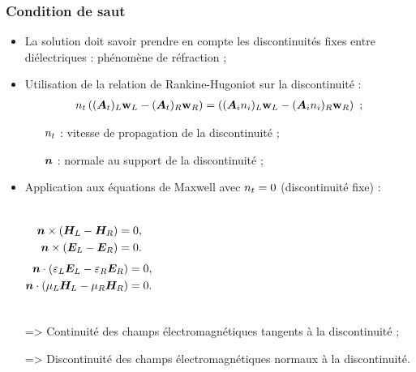 \begin{frame}
\frametitle{Condition de saut}
\vfill
\begin{itemize}
\item La solution doit savoir prendre en compte les discontinuités fixes entre diélectriques : phénomène de réfraction ;
\vfill
\item Utilisation de la relation de Rankine-Hugoniot sur la discontinuité :
\begin{align*}
	n_{t} \left( (\bm{A}_{t})_L \bm{\mathrm{w}}_L - (\bm{A}_{t})_R \bm{\mathrm{w}}_R \right) =
	\left( ({\bm{A}_{i}n_{i}})_L \bm{\mathrm{w}}_L - ({\bm{A}_{i}n_{i}})_R \bm{\mathrm{w}}_R \right) \ ;
\end{align*}
\begin{itemize}
\item [$n_{t}$] : vitesse de propagation de la discontinuité ;
\item [$\bm{n}$] : normale au support de la discontinuité ;
\end{itemize}
\vfill
\item Application aux équations de Maxwell avec $n_{t} = 0$ (discontinuité fixe) :
\begin{columns}
\begin{align*}
\bm{n} \times (\bm{H}_L - \bm{H}_R) &= 0 , \\
\bm{n} \times (\bm{E}_L - \bm{E}_R) &= 0 .
\end{align*}
\begin{align*}
\bm{n} \cdot (\varepsilon_L \bm{E}_L - \varepsilon_R \bm{E}_R) &= 0 , \\
\bm{n} \cdot (\mu_L \bm{H}_L - \mu_R \bm{H}_R) &= 0 .
\end{align*}
\end{columns}
\vfill
\item [=>] Continuité des champs électromagnétiques tangents à la discontinuité ;
\item [=>] Discontinuité des champs électromagnétiques normaux à la discontinuité.
\end{itemize}
\vfill
\end{frame}

